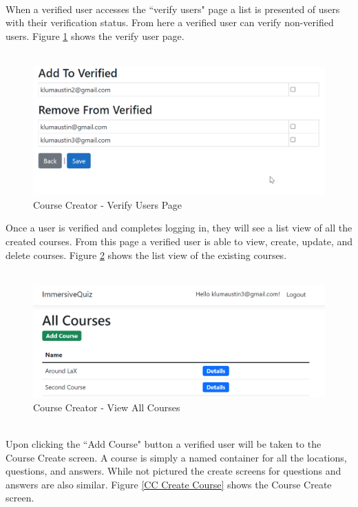 \\
When a verified user accesses the ``verify users" page a list is presented of users with their verification status. From here a verified user can verify non-verified users. Figure \ref{CC Verify} shows the verify user page. \\
\\
\begin{figure}[htb]
	\centering
	\includegraphics[width=.6\textwidth]{Requirements/assets/cc-add-verified-user.png}
	\caption[Course Creator - Verify Users Page]{\label{CC Verify}Course Creator - Verify Users Page}
\end{figure}
\clearpage
Once a user is verified and completes logging in, they will see a list view of all the created courses. From this page a verified user is able to view, create, update, and delete courses. Figure \ref{CC All Courses} shows the list view of the existing courses. \\
\\
\begin{figure}[htb]
 	\centering
 	\includegraphics[width=.6\textwidth]{Requirements/assets/cc-all-courses.png}
 	\caption[Course Creator - Veiw All Courses]{\label{CC All Courses}Course Creator - View All Courses}
\end{figure}
\\
Upon clicking the ``Add Course" button a verified user will be taken to the Course Create screen. A course is simply a named container for all the locations, questions, and answers. While not pictured the create screens for questions and answers are also similar. Figure \ref{CC Create Course} shows the Course Create screen. \\
